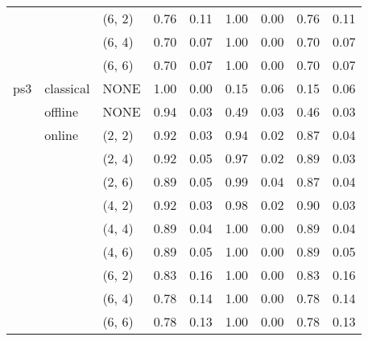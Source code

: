 \begin{tabular}{lllrrrrrr}
    &        & (6, 2) &     0.76 & 0.11 &     1.00 & 0.00 &  0.76 & 0.11 \\
    &        & (6, 4) &     0.70 & 0.07 &     1.00 & 0.00 &  0.70 & 0.07 \\
    &        & (6, 6) &     0.70 & 0.07 &     1.00 & 0.00 &  0.70 & 0.07 \\
ps3 & classical & NONE &     1.00 & 0.00 &     0.15 & 0.06 &  0.15 & 0.06 \\
    & offline & NONE &     0.94 & 0.03 &     0.49 & 0.03 &  0.46 & 0.03 \\
    & online & (2, 2) &     0.92 & 0.03 &     0.94 & 0.02 &  0.87 & 0.04 \\
    &        & (2, 4) &     0.92 & 0.05 &     0.97 & 0.02 &  0.89 & 0.03 \\
    &        & (2, 6) &     0.89 & 0.05 &     0.99 & 0.04 &  0.87 & 0.04 \\
    &        & (4, 2) &     0.92 & 0.03 &     0.98 & 0.02 &  0.90 & 0.03 \\
    &        & (4, 4) &     0.89 & 0.04 &     1.00 & 0.00 &  0.89 & 0.04 \\
    &        & (4, 6) &     0.89 & 0.05 &     1.00 & 0.00 &  0.89 & 0.05 \\
    &        & (6, 2) &     0.83 & 0.16 &     1.00 & 0.00 &  0.83 & 0.16 \\
    &        & (6, 4) &     0.78 & 0.14 &     1.00 & 0.00 &  0.78 & 0.14 \\
    &        & (6, 6) &     0.78 & 0.13 &     1.00 & 0.00 &  0.78 & 0.13 \\
\bottomrule
\end{tabular}
